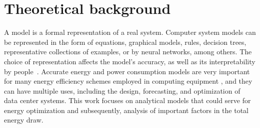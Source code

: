 %
%
%

\section{Theoretical background} \label{sec:background}

A model is a formal representation of a real system. Computer system models can be represented in the form of equations, graphical models, rules, decision trees, representative collections of examples, or by neural networks, among others. The choice of representation affects the model's accuracy, as well as its interpretability by people~\cite{Hypothesis2012EncyclopediaLearning, Roy2019ForecastingNetwork, Zhu2019PredictingLearning}. Accurate energy and power consumption models are very important for many energy efficiency schemes employed in computing equipment \cite{Rivoire2007ModelsOptimizations}, and they can have multiple uses, including the design, forecasting, and optimization of data center systems. This work focuses on analytical models that could serve for energy optimization and subsequently, analysis of important factors in the total energy draw.

